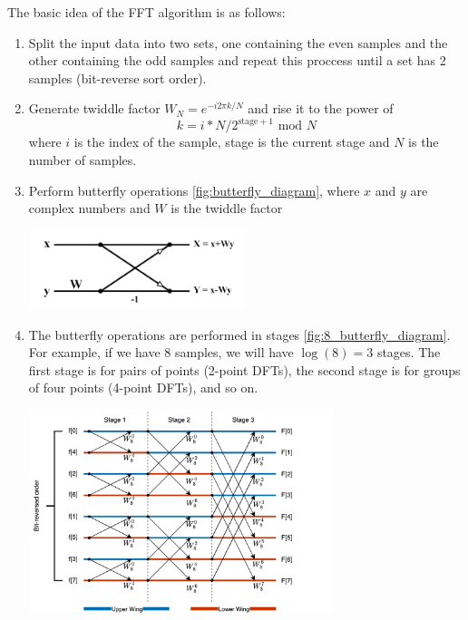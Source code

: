 The basic idea of the FFT algorithm is as follows:
\begin{enumerate}
    \item Split the input data into two sets, one containing the even samples and the other containing the odd samples and repeat this proccess until a set has 2 samples (bit-reverse sort order).
    \item Generate twiddle factor $W_N = e^{-i 2 \pi k / N}$ and rise it to the power of \\
    \begin{equation}
        k = i * N / 2^{\text{stage} + 1} \text{ mod } N
    \end{equation}
    where $i$ is the index of the sample, stage is the current stage and $N$ is the number of samples.
    \item Perform butterfly operations \ref{fig:butterfly_diagram}, where $x$ and $y$ are complex numbers and $W$ is the twiddle factor
    \begin{minipage}{1\textwidth}
        \centering
        \includegraphics[width=0.5\textwidth]{"images/butterfly_diagram.png"}
        \label{fig:butterfly_diagram}
    \end{minipage}
    \item The butterfly operations are performed in stages \ref{fig:8_butterfly_diagram}. For example, if we have 8 samples, we will have $\log(8) = 3 $ stages. The first stage is for pairs of points (2-point DFTs), the second stage is for groups of four points (4-point DFTs), and so on.
    \begin{minipage}{1\textwidth}
        \centering
        \includegraphics[width=0.7\textwidth]{"images/8_butterfly_diagram.png"}
        \label{fig:8_butterfly_diagram}
    \end{minipage}
\end{enumerate}

